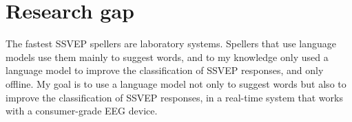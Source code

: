 \section{Research gap}
\label{sec:gap}

The fastest \ac{SSVEP} spellers are laboratory systems. Spellers that use language models
use them mainly to suggest words, and to my knowledge only \citet{zhang2025improving} used a
language model to improve the classification of \ac{SSVEP} responses, and only offline. My
goal is to use a language model not only to suggest words but also to improve the
classification of \ac{SSVEP} responses, in a real-time system that works with a
consumer-grade \ac{EEG} device.
